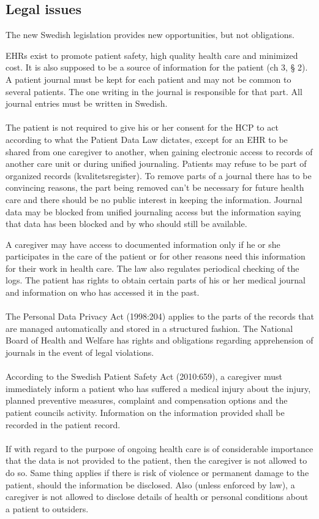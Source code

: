 \documentclass[14pt]{article}
\begin{document}
\subsection{Legal issues}

The new Swedish legislation provides new opportunities, but not obligations. \cite{RiR19}

\glspl{EHR} exist to promote patient safety, high quality health care and minimized cost. It is also supposed to be a source of information for the patient (ch 3, § 2). A patient journal must be kept for each patient and may not be common to several patients. The one writing in the journal is responsible for that part. All journal entries must be written in Swedish. \cite{PatientDataAct}
\\\\
The patient is not required to give his or her consent for the \gls{HCP} to act according to what the Patient Data Law dictates, except for an \gls{EHR} to be shared from one caregiver to another, when gaining electronic access to records of another care unit or during unified journaling. Patients may refuse to be part of organized records (kvalitetsregister). To remove parts of a journal there has to be convincing reasons, the part being removed can't be necessary for future health care and there should be no public interest in keeping the information. Journal data may be blocked from unified journaling access but the information saying that data has been blocked and by who should still be available. 

A caregiver may have access to documented information only if he or she participates in the care of the patient or for other reasons need this information for their work in health care. The law also regulates periodical checking of the logs. The patient has rights to obtain certain parts of his or her medical journal and information on who has accessed it in the past.\cite{PatientDataAct}
\\\\
The Personal Data Privacy Act (1998:204) applies to the parts of the records that are managed automatically and stored in a structured fashion. The National Board of Health and Welfare has rights and obligations regarding apprehension of journals in the event of legal violations.\cite{PatientDataAct}
\\\\
According to the Swedish Patient Safety Act (2010:659), a caregiver must immediately inform a patient who has suffered a medical injury
about the injury, planned preventive measures, complaint and compensation
options and the patient councils activity. Information on the information provided shall be recorded in the patient record.\cite{PatientSafetyAct}
\\\\
If with regard to the purpose of ongoing health care is of considerable importance
that the data is not provided to the patient, then the caregiver is not allowed to
do so. Same thing applies if there is risk of violence or permanent damage to the
patient, should the information be disclosed. Also (unless enforced by law), a caregiver is not allowed to disclose details of health or personal conditions about a patient to outsiders.\cite{PatientSafetyAct}
\end{document}
